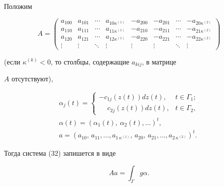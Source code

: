 Положим


$$


A=


\begin{pmatrix}


a_{100} & a_{101} & \dotsb & a_{10\kappa^{(1)}} &


-a_{200} & -a_{201} & \dotsb & -a_{20\kappa^{(2)}} \\


a_{110} & a_{111} & \dotsb & a_{11\kappa^{(1)}} &


-a_{210} & -a_{211} & \dotsb & -a_{21\kappa^{(2)}} \\


a_{120} & a_{121} & \dotsb & a_{12\kappa^{(1)}} &


-a_{220} & -a_{221} & \dotsb & -a_{22\kappa^{(2)}} \\


\vdots & \vdots & \ddots & \vdots & \vdots & \vdots & \ddots & \vdots


\end{pmatrix}


$$


(если $\kappa^{(k)}<0$, то столбцы, содержащие $a_{kij}$, в матрице


$A$ отсутствуют),


\begin{gather*}


\alpha_j(t)=\begin{cases}


-c_{1j}(z(t))dz(t), & t\in\Gamma_1;\\


\phantom{-}c_{2j}(z(t))dz(t), & t\in\Gamma_2,


\end{cases}


\\


\alpha (t)=(\alpha_1(t),\ \alpha_2(t),\dotsc)^t, \\


%


a=(a_{10},\, a_{11},\dotsc,a_{1\, \kappa^{(1)}},


\, a_{20},\, a_{21},\dotsc,a_{2\, \kappa^{(2)}})^t.


\end{gather*}


Тогда система (32) запишется в виде


\begin{equation}


Aa=\int_\Gamma g\alpha.


\end{equation}


